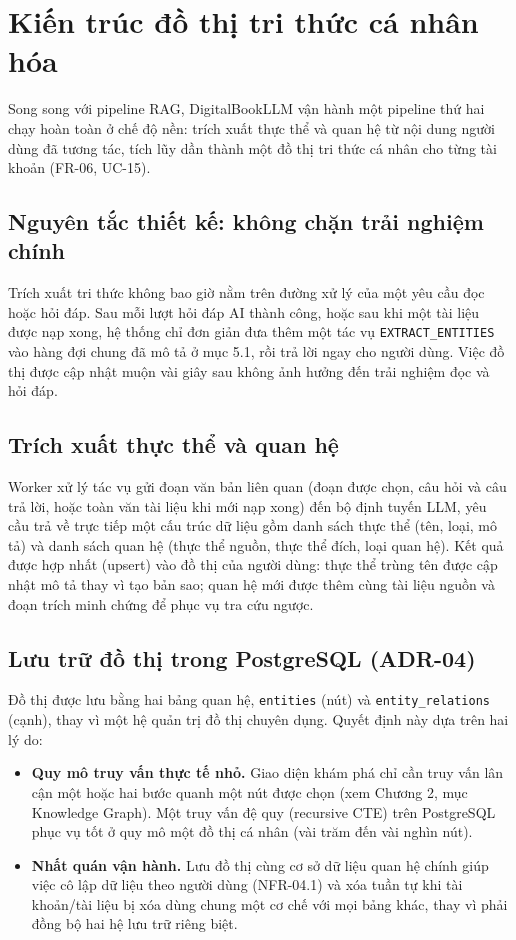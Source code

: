 \section{Kiến trúc đồ thị tri thức cá nhân hóa}
Song song với pipeline RAG, DigitalBookLLM vận hành một pipeline thứ hai chạy hoàn toàn ở chế độ nền: trích xuất thực thể và quan hệ từ nội dung người dùng đã tương tác, tích lũy dần thành một đồ thị tri thức cá nhân cho từng tài khoản (FR-06, UC-15).

\subsection{Nguyên tắc thiết kế: không chặn trải nghiệm chính}
Trích xuất tri thức không bao giờ nằm trên đường xử lý của một yêu cầu đọc hoặc hỏi đáp. Sau mỗi lượt hỏi đáp AI thành công, hoặc sau khi một tài liệu được nạp xong, hệ thống chỉ đơn giản đưa thêm một tác vụ \texttt{EXTRACT\_ENTITIES} vào hàng đợi chung đã mô tả ở mục 5.1, rồi trả lời ngay cho người dùng. Việc đồ thị được cập nhật muộn vài giây sau không ảnh hưởng đến trải nghiệm đọc và hỏi đáp.

\subsection{Trích xuất thực thể và quan hệ}
Worker xử lý tác vụ gửi đoạn văn bản liên quan (đoạn được chọn, câu hỏi và câu trả lời, hoặc toàn văn tài liệu khi mới nạp xong) đến bộ định tuyến LLM, yêu cầu trả về trực tiếp một cấu trúc dữ liệu gồm danh sách thực thể (tên, loại, mô tả) và danh sách quan hệ (thực thể nguồn, thực thể đích, loại quan hệ). Kết quả được hợp nhất (upsert) vào đồ thị của người dùng: thực thể trùng tên được cập nhật mô tả thay vì tạo bản sao; quan hệ mới được thêm cùng tài liệu nguồn và đoạn trích minh chứng để phục vụ tra cứu ngược.

\subsection{Lưu trữ đồ thị trong PostgreSQL (ADR-04)}
Đồ thị được lưu bằng hai bảng quan hệ, \texttt{entities} (nút) và \texttt{entity\_relations} (cạnh), thay vì một hệ quản trị đồ thị chuyên dụng. Quyết định này dựa trên hai lý do:
\begin{itemize}
    \item \textbf{Quy mô truy vấn thực tế nhỏ.} Giao diện khám phá chỉ cần truy vấn lân cận một hoặc hai bước quanh một nút được chọn (xem Chương 2, mục Knowledge Graph). Một truy vấn đệ quy (recursive CTE) trên PostgreSQL phục vụ tốt ở quy mô một đồ thị cá nhân (vài trăm đến vài nghìn nút).
    \item \textbf{Nhất quán vận hành.} Lưu đồ thị cùng cơ sở dữ liệu quan hệ chính giúp việc cô lập dữ liệu theo người dùng (NFR-04.1) và xóa tuần tự khi tài khoản/tài liệu bị xóa dùng chung một cơ chế với mọi bảng khác, thay vì phải đồng bộ hai hệ lưu trữ riêng biệt.
\end{itemize}

